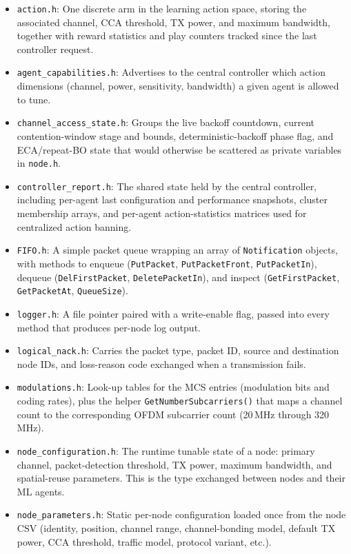 \documentclass[11pt,a4paper]{article}
\begin{document}
\begin{itemize}
    \item \texttt{action.h}: One discrete arm in the learning action space, storing the associated channel, CCA threshold, TX power, and maximum bandwidth, together with reward statistics and play counters tracked since the last controller request.
    \item \texttt{agent\_capabilities.h}: Advertises to the central controller which action dimensions (channel, power, sensitivity, bandwidth) a given agent is allowed to tune.
    \item \texttt{channel\_access\_state.h}: Groups the live backoff countdown, current contention-window stage and bounds, deterministic-backoff phase flag, and ECA/repeat-BO state that would otherwise be scattered as private variables in \texttt{node.h}.
    \item \texttt{controller\_report.h}: The shared state held by the central controller, including per-agent last configuration and performance snapshots, cluster membership arrays, and per-agent action-statistics matrices used for centralized action banning.
    \item \texttt{FIFO.h}: A simple packet queue wrapping an array of \texttt{Notification} objects, with methods to enqueue (\texttt{PutPacket}, \texttt{PutPacketFront}, \texttt{PutPacketIn}), dequeue (\texttt{DelFirstPacket}, \texttt{DeletePacketIn}), and inspect (\texttt{GetFirstPacket}, \texttt{GetPacketAt}, \texttt{QueueSize}).
    \item \texttt{logger.h}: A file pointer paired with a write-enable flag, passed into every method that produces per-node log output.
    \item \texttt{logical\_nack.h}: Carries the packet type, packet ID, source and destination node IDs, and loss-reason code exchanged when a transmission fails.
    \item \texttt{modulations.h}: Look-up tables for the MCS entries (modulation bits and coding rates), plus the helper \texttt{GetNumberSubcarriers()} that maps a channel count to the corresponding OFDM subcarrier count (20\,MHz through 320\,MHz).
    \item \texttt{node\_configuration.h}: The runtime tunable state of a node: primary channel, packet-detection threshold, TX power, maximum bandwidth, and spatial-reuse parameters. This is the type exchanged between nodes and their ML agents.
    \item \texttt{node\_parameters.h}: Static per-node configuration loaded once from the node CSV (identity, position, channel range, channel-bonding model, default TX power, CCA threshold, traffic model, protocol variant, etc.).

\end{itemize}
\end{document}
